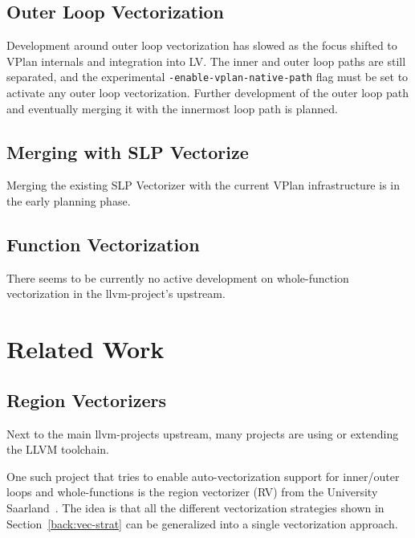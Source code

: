 \documentclass[sigplan,11pt,nonacm]{acmart}
\begin{document}
\subsection{Outer Loop Vectorization}
Development around outer loop vectorization has slowed as the focus shifted to VPlan internals 
and integration into LV. The inner and outer loop paths are still separated, and the 
experimental \texttt{-enable-\allowbreak vplan-\allowbreak native-\allowbreak path} flag must be 
set to activate any outer 
loop vectorization. Further development of the outer loop path and eventually merging it 
with the innermost loop path is planned.

\subsection{Merging with SLP Vectorize}
Merging the existing SLP Vectorizer with the current VPlan infrastructure is in the early planning phase.

\subsection{Function Vectorization}
There seems to be currently no active development on whole-function vectorization in the
llvm-project's upstream.




\section{Related Work}
\label{sec:relatedwork}
\subsection{Region Vectorizers}
Next to the main llvm-projects upstream, many projects are using or extending the LLVM toolchain.

One such project that tries to enable auto-vectorization support for inner/outer loops and 
whole-functions is the region vectorizer (RV) from the University Saarland~\cite{rv}.
The idea is that all the different vectorization strategies shown in Section~\ref{back:vec-strat}
can be generalized into a single vectorization approach.
\end{document}
